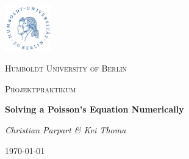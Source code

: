 \begin{titlepage}
	\centering
	\includegraphics[width=0.15\textwidth]{graphics/huberlin_logo}\par\vspace{1cm}
	{\scshape\LARGE Humboldt University of Berlin \par}
	\vspace{1cm}
	{\scshape\Large Projektpraktikum \par}
	\vspace{1.5cm}
	{\huge\bfseries Solving a Poisson's Equation Numerically \par}
	\vspace{2cm}
	{\Large\itshape Christian Parpart \& Kei Thoma \par}
	\vfill

	\vfill

	{\large \today\par}
\end{titlepage}

\tableofcontents
\newpage
